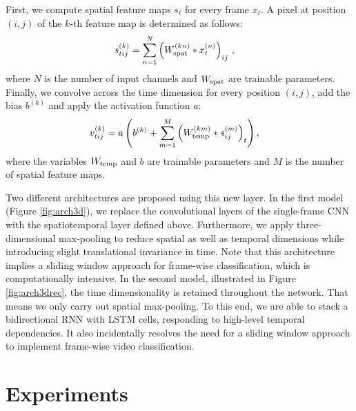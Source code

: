 \documentclass[11pt,a4paper]{article} \usepackage{a4wide}
\begin{document}
First, we compute spatial feature maps $s_t$ for every frame $x_t$. A pixel at position $(i,j)$ of the $k$-th feature map is determined as follows:
\begin{align}
s_{tij}^{(k)} &=  
       				\sum_{n=1}^{N}
            \left(W_{\textnormal{spat}}^{(kn)} * x^{(n)}_{t}\right)_{ij}\,,
\end{align}
where $N$ is the number of input channels and $W_{\textnormal{spat}}$ are trainable parameters. Finally, we convolve across the time dimension for every position $(i,j)$, add the bias $b^{(k)}$ and apply the activation function $a$:
\begin{align}
v_{tij}^{(k)} &= a \left( 
        b^{(k)} + \sum_{m=1}^{M} 
\left(W^{(km)}_{\textnormal{temp}} * s^{(m)}_{ij}\right)_{t}  \right),
\end{align}
where the variables $W_{\textnormal{temp}}$ and $b$ are trainable parameters and $M$ is the number of spatial feature maps.






Two different architectures are proposed using this new layer. In the first model (Figure \ref{fig:arch3d}), we replace the convolutional layers of the single-frame CNN with the spatiotemporal layer defined above. Furthermore, we apply three-dimensional max-pooling to reduce spatial as well as temporal dimensions while introducing slight translational invariance in time. Note that this architecture implies a sliding window approach for frame-wise classification, which is computationally intensive.
In the second model, illustrated in Figure \ref{fig:arch3drec}, the time dimensionality is retained throughout the network. That means we only carry out spatial max-pooling. To this end, we are able to stack a bidirectional RNN with LSTM cells, responding to high-level temporal dependencies. It also incidentally resolves the need for a sliding window approach to implement frame-wise video classification.






\section{Experiments} \label{sec:exp}
\end{document}
